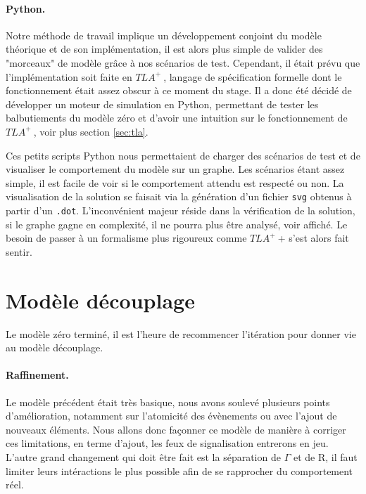 \documentclass[oneside, a4paper, 11pt]{book}
\newcommand{\TLA}{\ensuremath{TLA^+~}}
\newcommand{\trainFmt}[1]{{\color{traincolor} #1}}
\begin{document}
\paragraph{Python.}
Notre méthode de travail implique un développement conjoint du modèle théorique et de son implémentation, il est alors plus simple de valider des "morceaux" de modèle grâce à nos scénarios de test.
Cependant, il était prévu que l'implémentation soit faite en \TLA, langage de spécification formelle dont le fonctionnement était assez obscur à ce moment du stage.
Il a donc été décidé de développer un moteur de simulation en Python, permettant de tester les balbutiements du modèle zéro et d'avoir une intuition sur le fonctionnement de \TLA, voir plus section \ref{sec:tla}.


\begin{figure}
\end{figure}
\noindent
Ces petits scripts Python nous permettaient de charger des scénarios de test et de visualiser le comportement du modèle sur un graphe. Les scénarios étant assez simple, il est facile de voir si le comportement attendu est respecté ou non.
La visualisation de la solution se faisait via la génération d'un fichier \texttt{svg} obtenus à partir d'un \texttt{.dot}. L'inconvénient majeur réside dans la vérification de la solution, si le graphe gagne en complexité, il ne pourra plus être analysé, voir affiché.
Le besoin de passer à un formalisme plus rigoureux comme \TLA+ s'est alors fait sentir.












\section{Modèle découplage}

Le modèle zéro terminé, il est l'heure de recommencer l'itération pour donner vie au modèle découplage.

\paragraph{Raffinement.} Le modèle précédent était très basique, nous avons soulevé plusieurs points d'amélioration, notamment sur l'atomicité des évènements ou avec l'ajout de nouveaux éléments. Nous allons donc façonner ce modèle de manière à corriger ces limitations, en terme d'ajout, les feux de signalisation entrerons en jeu.
L'autre grand changement qui doit être fait est la séparation de \trainFmt{$\Gamma$} et de R, il faut limiter leurs intéractions le plus possible afin de se rapprocher du comportement réel.
\end{document}
